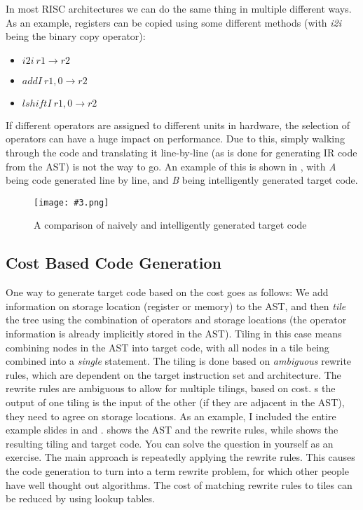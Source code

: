 \documentclass{article}
\newcommand{\fig}[4]{
	\begin{figure}[#1]
		\center
		\texttt{[image: \#3.png]}
		\caption{#4}
		\label{fig:#3}
	\end{figure}
	}
\begin{document}
In most RISC architectures we can do the same thing in multiple different ways.
As an example, registers can be copied using some different methods (with \emph{i2i} being the binary copy operator):
\begin{itemize}
	\item $i2i\ r1 \rightarrow r2$
	\item $addI\ r1, 0 \rightarrow r2$
	\item $lshiftI\ r1, 0 \rightarrow r2$
\end{itemize}
If different operators are assigned to different units in hardware, the selection of operators can have a huge impact on performance.
Due to this, simply walking through the code and translating it line-by-line (as is done for generating IR code from the AST) is not the way to go.
An example of this is shown in , with \emph{A} being code generated line by line, and \emph{B} being intelligently generated target code.

\fig{h}{}{codegeneration}{A comparison of naively and intelligently generated target code}

\subsection{Cost Based Code Generation}
One way to generate target code based on the cost goes as follows:
We add information on storage location (register or memory) to the AST, and then \emph{tile} the tree using the combination of operators and storage locations (the operator information is already implicitly stored in the AST).
Tiling in this case means combining nodes in the AST into target code, with all nodes in a tile being combined into a \emph{single} statement.
The tiling is done based on \emph{ambiguous} rewrite rules, which are dependent on the target instruction set and architecture.
The rewrite rules are ambiguous to allow for multiple tilings, based on cost.
s the output of one tiling is the input of the other (if they are adjacent in the AST), they need to agree on storage locations.
As an example, I included the entire example slides in  and .
 shows the AST and the rewrite rules, while  shows the resulting tiling and target code.
You can solve the question in  yourself as an exercise.
The main approach is repeatedly applying the rewrite rules.
This causes the code generation to turn into a term rewrite problem, for which other people have well thought out algorithms.
The cost of matching rewrite rules to tiles can be reduced by using lookup tables.
\end{document}
